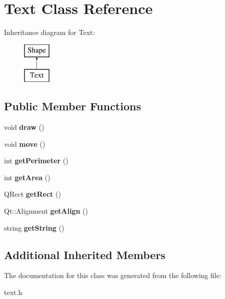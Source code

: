 \hypertarget{class_text}{}\section{Text Class Reference}
\label{class_text}
Inheritance diagram for Text\+:\begin{figure}[H]
\begin{center}
\leavevmode
\includegraphics[height=2.000000cm]{class_text}
\end{center}
\end{figure}
\subsection*{Public Member Functions}
\begin{DoxyCompactItemize}
\item 
\mbox{\label{class_text_adedc069a9ad622bf9d2cf6d194a01b39}} 
void {\bfseries draw} ()
\item 
\mbox{\label{class_text_afb3b7b69bd321c09e8bfbdebb6d21e11}} 
void {\bfseries move} ()
\item 
\mbox{\label{class_text_a77461345a606fb745f3ee30977c89031}} 
int {\bfseries get\+Perimeter} ()
\item 
\mbox{\label{class_text_a4be6e639837d756d7d346ab785a5f04e}} 
int {\bfseries get\+Area} ()
\item 
\mbox{\label{class_text_a81d3c6b7ab019dd8eed8b389007152fa}} 
Q\+Rect {\bfseries get\+Rect} ()
\item 
\mbox{\label{class_text_a63ccf2f936b2230e2a980eaf875509a2}} 
Qt\+::\+Alignment {\bfseries get\+Align} ()
\item 
\mbox{\label{class_text_a2da9d282ef7497a76d3edf04b64ce39c}} 
string {\bfseries get\+String} ()
\end{DoxyCompactItemize}
\subsection*{Additional Inherited Members}


The documentation for this class was generated from the following file\+:\begin{DoxyCompactItemize}
\item 
text.\+h\end{DoxyCompactItemize}
